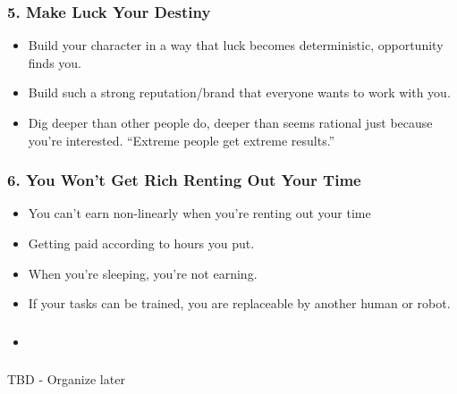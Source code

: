 \begin{frame}[fragile]
\frametitle{5. Make Luck Your Destiny}
\begin{itemize}
\item Build your character in a way that luck becomes deterministic, opportunity finds you.
\item Build such a strong reputation/brand that everyone wants to work with you.
\item  Dig deeper than other people do, deeper than seems rational just because you’re interested. ``Extreme people get extreme results.''
\end{itemize}
\end{frame}

\begin{frame}[fragile]
\frametitle{6. You Won't Get Rich Renting Out Your Time}
\begin{itemize}
\item You can't earn non-linearly when you're renting out your time
\item Getting paid according to hours you put.
\item When you're sleeping, you’re not earning.
\item If your tasks can be trained, you are replaceable by another human or robot.
\end{itemize}
\end{frame}

\begin{frame}[fragile]
\frametitle{}
\begin{itemize}
\item 
\end{itemize}
\end{frame}

\begin{frame}[fragile]\frametitle{}
\begin{center}
{\Large TBD - Organize later}

\end{center}
\end{frame}

